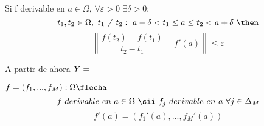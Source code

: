 \begin{prop}
    Si f derivable en $a\in\Omega$, $\forall \varepsilon>0$ $\exists \delta>0 : $
    $$t_1, t_2 \in \Omega, \ t_1 \neq t_2 :\ a-\delta < t_1 \leq a \leq t_2 < a+\delta \ \then$$
    $$\left \|\dfrac{f(t_2)-f(t_1)}{t_2-t_1}-f'(a)\right \|\leq \varepsilon$$
\end{prop}

\begin{notacion}
    A partir de ahora $Y=\rm$
\end{notacion}

\begin{prop}
    $f=(f_1,...,f_M): \Omega \flecha \rm$ 
    $$f \ derivable \ en \ a\in\Omega \ \sii \ f_j \ derivable \ en \ a \ \forall j\in\Delta_M$$
    $$f'(a)=\left (f_1'(a),...,f_M'(a)\right)$$
\end{prop}

